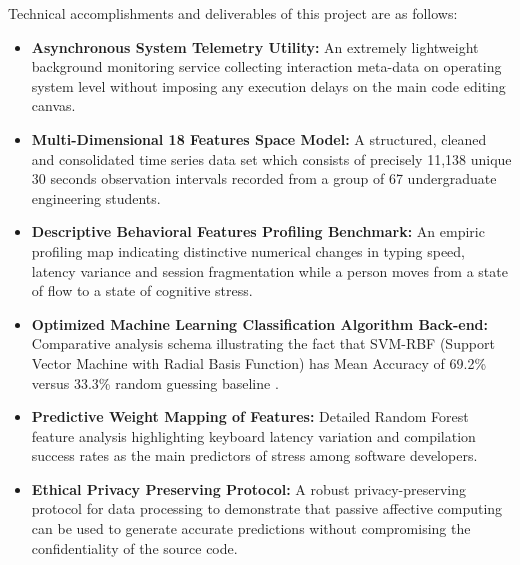 \noindent Technical accomplishments and deliverables of this project are as follows:
\begin{itemize}
    \item \textbf{Asynchronous System Telemetry Utility:} An extremely lightweight background monitoring service collecting interaction meta-data on operating system level without imposing any execution delays on the main code editing canvas.
    
    \item \textbf{Multi-Dimensional 18 Features Space Model:} A structured, cleaned and consolidated time series data set which consists of precisely 11,138 unique 30 seconds observation intervals recorded from a group of 67 undergraduate engineering students.
    
    \item \textbf{Descriptive Behavioral Features Profiling Benchmark:} An empiric profiling map indicating distinctive numerical changes in typing speed, latency variance and session fragmentation while a person moves from a state of flow to a state of cognitive stress.
    
    \item \textbf{Optimized Machine Learning Classification Algorithm Back-end:} Comparative analysis schema illustrating the fact that SVM-RBF (Support Vector Machine with Radial Basis Function) has Mean Accuracy of 69.2\% versus 33.3\% random guessing baseline \cite{mdpi389}.
    
    \item \textbf{Predictive Weight Mapping of Features:} Detailed Random Forest feature analysis highlighting keyboard latency variation and compilation success rates as the main predictors of stress among software developers.
        
        \item \textbf{Ethical Privacy Preserving Protocol:} A robust privacy-preserving protocol for data processing to demonstrate that passive affective computing can be used to generate accurate predictions without compromising the confidentiality of the source code.
\end{itemize}

